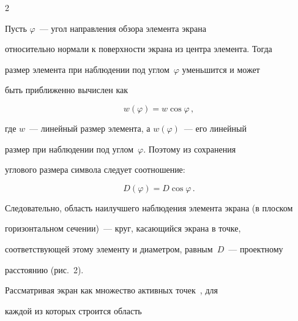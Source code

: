 \begin{multicols}{2}


    


    Пусть $\varphi$~--- угол направления обзора элемента экрана 


относительно нормали к поверхности экрана из центра элемента. Тогда 


размер элемента при наблюдении под углом~$\varphi$ уменьшится и может 


быть приближенно вычислен как


    \begin{equation}


    w(\varphi)=w\cos\varphi\,,


    \label{e2chu}


    \end{equation}


    где $w$~--- линейный размер элемента, а $w(\varphi)$~--- его линейный 


размер при наблюдении под углом~$\varphi$. Поэтому из сохранения 


углового размера символа следует соотношение:


    \begin{equation*}


    D(\varphi)=D\cos\varphi\,.




    \end{equation*}





Следовательно, область наилучшего наблюдения элемента экрана (в плоском 


горизонтальном сечении)~--- круг, касающийся экрана в точке, 


соответствующей этому элементу и диаметром, равным~$D$~--- проектному 


расстоянию (рис.~2).














    Рассматривая экран как множество активных точек~\cite{16chu}, для 


каждой из которых строится область\linebreak\vspace*{-12pt}






\end{multicols}
